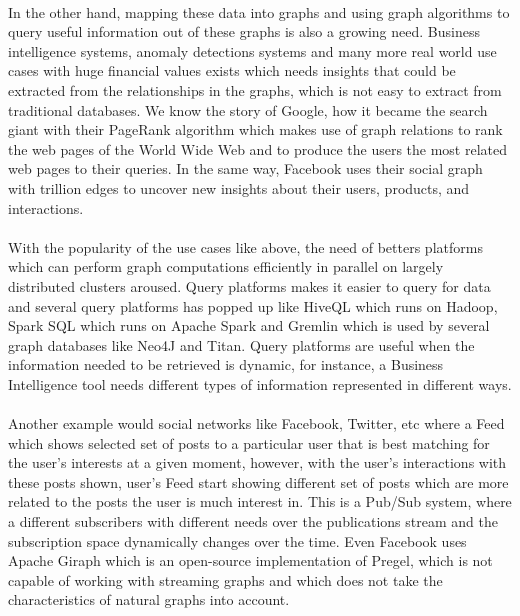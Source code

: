 \documentclass[12pt]{report}
\numberwithin{figure}{section}
\numberwithin{table}{section}
\begin{document}
\paragraph{}

In the other hand, mapping these data into graphs and using graph algorithms to query useful information out of these graphs is also a growing need. Business intelligence systems, anomaly detections systems and many more real world use cases with huge financial values exists which needs insights that could be extracted from the relationships in the graphs, which is not easy to extract from traditional databases. We know the story of Google, how it became the search giant with their PageRank\cite{PageRank} algorithm which makes use of graph relations to rank the web pages of the World Wide Web and to produce the users the most related web pages to their queries. In the same way, Facebook uses their social graph with trillion edges\cite{Facebook} to uncover new insights about their users, products, and interactions.

\paragraph{}

With the popularity of the use cases like above, the need of betters platforms which can perform graph computations efficiently in parallel on largely distributed clusters aroused. Query platforms makes it easier to query for data and several query platforms has popped up like HiveQL which runs on Hadoop, Spark SQL which runs on Apache Spark and Gremlin which is used by several graph databases like Neo4J and Titan. Query platforms are useful when the information needed to be retrieved is dynamic, for instance, a Business Intelligence tool needs different types of information represented in different ways.

\paragraph{}

Another example would social networks like Facebook, Twitter, etc where a Feed which shows selected set of posts to a particular user that is best matching for the user’s interests at a given moment, however, with the user’s interactions with these posts shown, user’s Feed start showing different set of posts which are more related to the posts the user is much interest in. This is a Pub/Sub system, where a different subscribers with different needs over the publications stream and the subscription space dynamically changes over the time\cite{Horawalavithana}. Even Facebook uses\cite{Facebook} Apache Giraph which is an open-source implementation of Pregel\cite{Pregel}, which is not capable of working with streaming graphs and which does not take the characteristics of natural graphs into account. 
\end{document}
